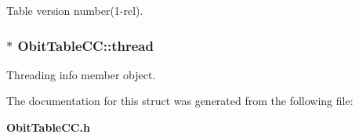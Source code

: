 Table version number(1-rel). 

\subsubsection{$\ast$ {\bf Obit\-Table\-CC::thread}}\label{structObitTableCC_o4}


Threading info member object. 



The documentation for this struct was generated from the following file:\begin{CompactItemize}
\item 
{\bf Obit\-Table\-CC.h}\end{CompactItemize}
